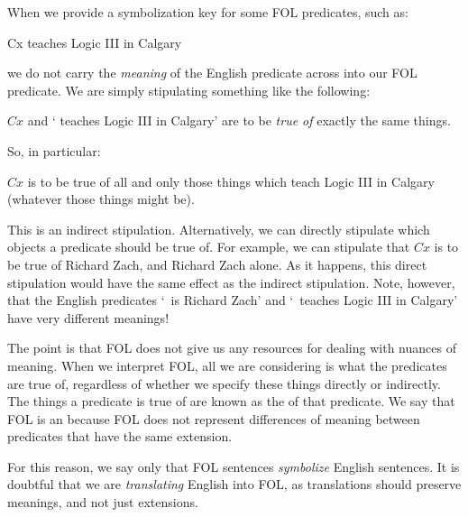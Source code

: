 When we provide a symbolization key for some FOL predicates, such as:
	\begin{ekey}
		\item[Cx]  teaches Logic III in Calgary
	\end{ekey} 
we do not carry the \emph{meaning} of the English predicate across into our FOL predicate. We are simply stipulating something like the following:
	\begin{ebullet}
		\item $Cx$ and ` teaches Logic III in Calgary' are to be \emph{true of} exactly the same things. 
	\end{ebullet}
So, in particular:
	\begin{ebullet}
		\item $Cx$ is to be true of all and only those things which teach Logic III in Calgary (whatever those things might be).
	\end{ebullet}
This is an indirect stipulation. Alternatively, we can directly stipulate which objects a predicate should be true of. For example, we can stipulate that $Cx$ is to be true of Richard Zach, and Richard Zach alone. As it happens, this direct stipulation would have the same effect as the indirect stipulation. Note, however, that the English predicates `\blank\ is Richard Zach' and `\blank\ teaches Logic III in Calgary' have very different meanings!

The point is that FOL does not give us any resources for dealing with nuances of meaning. When we interpret FOL, all we are considering is what the predicates are true of, regardless of whether we specify these things directly or indirectly. The things a predicate is true of are known as the  of that predicate. We say that FOL is an  because FOL does not represent differences of meaning between predicates that have the same extension.    

For this reason, we say only that FOL sentences \emph{symbolize} English sentences. It is doubtful that we are \emph{translating} English into FOL, as translations should preserve meanings, and not just extensions.

